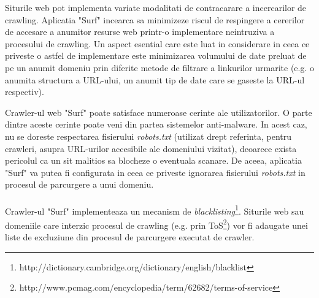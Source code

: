 \newcommand{\blacklistingDefinition}{http://dictionary.cambridge.org/dictionary/english/blacklist}
\newcommand{\tosDefinition}{http://www.pcmag.com/encyclopedia/term/62682/terms-of-service}

Siturile web pot implementa variate modalitati de contracarare a incercarilor de crawling. Aplicatia "Surf" incearca sa minimizeze riscul de respingere a cererilor de accesare a anumitor resurse web printr-o implementare neintruziva a procesului de crawling. Un aspect esential care este luat in considerare in ceea ce priveste o astfel de implementare este minimizarea volumului de date preluat de pe un anumit domeniu prin diferite metode de filtrare a linkurilor urmarite (e.g. o anumita structura a URL-ului, un anumit tip de date care se gaseste la URL-ul respectiv).
	

\noindent
Crawler-ul web "Surf" poate satisface numeroase cerinte ale utilizatorilor. O parte dintre aceste cerinte poate veni din partea sistemelor anti-malware. In acest caz, nu se doreste respectarea fisierului \emph{robots.txt} (utilizat drept referinta, pentru crawleri, asupra URL-urilor accesibile ale domeniului vizitat), deoarece exista pericolul ca un sit malitios sa blocheze o eventuala scanare. De aceea, aplicatia "Surf" va putea fi configurata in ceea ce priveste ignorarea fisierului \emph{robots.txt} in procesul de parcurgere a unui domeniu.
\\
\\
Crawler-ul "Surf" implementeaza un mecanism de \emph{blacklisting}\footnote{\blacklistingDefinition}. Siturile web sau domeniile care interzic procesul de crawling (e.g. prin ToS\footnote{\tosDefinition}) vor fi adaugate unei liste de excluziune din procesul de parcurgere executat de crawler.
